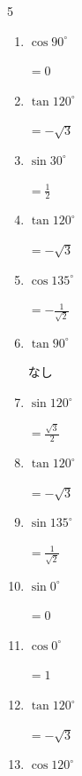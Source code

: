 \begin{multicols}{5}
\begin{enumerate}
        $\displaystyle =1$

  \item $\displaystyle \cos{90^\circ}$

        $\displaystyle =0$

  \item $\displaystyle \tan{120^\circ}$

        $\displaystyle =-\sqrt{3}$

  \item $\displaystyle \sin{30^\circ}$

        $\displaystyle =\frac{1}{2}$

  \item $\displaystyle \tan{120^\circ}$

        $\displaystyle =-\sqrt{3}$

\columnbreak %

\resetques

  \item $\displaystyle \cos{135^\circ}$

        $\displaystyle =-\frac{1}{\sqrt{2}}$

  \item $\displaystyle \tan{90^\circ}$

        $\displaystyle なし$

  \item $\displaystyle \sin{120^\circ}$

        $\displaystyle =\frac{\sqrt{3}}{2}$

  \item $\displaystyle \tan{120^\circ}$

        $\displaystyle =-\sqrt{3}$

  \item $\displaystyle \sin{135^\circ}$

        $\displaystyle =\frac{1}{\sqrt{2}}$

  \item $\displaystyle \sin{0^\circ}$

        $\displaystyle =0$

  \item $\displaystyle \cos{0^\circ}$

        $\displaystyle =1$

  \item $\displaystyle \tan{120^\circ}$

        $\displaystyle =-\sqrt{3}$

  \item $\displaystyle \cos{120^\circ}$


\end{enumerate}
\end{multicols}
